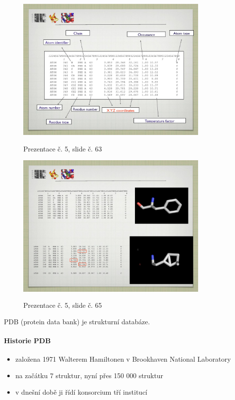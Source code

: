 \documentclass[DIV=8]{scrreprt}
\begin{document}
\begin{figure}
    \caption{Prezentace č. 5, slide č. 63}
    \includegraphics[width=0.85\textwidth]{slides-5/slide-63.jpg}
    \centering
    \label{slides-5-slide-63}
\end{figure}
\begin{figure}
    \caption{Prezentace č. 5, slide č. 65}
    \includegraphics[width=0.85\textwidth]{slides-5/slide-65.jpg}
    \centering
    \label{slides-5-slide-65}
\end{figure}


PDB (protein data bank) je strukturní databáze.

\paragraph{Historie PDB}
\begin{itemize}[nosep]
    \item založena 1971 Walterem Hamiltonen v Brookhaven National Laboratory
    \item na začátku 7 struktur, nyní přes 150 000 struktur
    \item v dnešní době ji řídí konsorcium tří institucí
\end{itemize}
\end{document}
